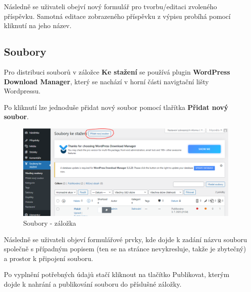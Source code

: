 \documentclass[12pt,a4paper]{article}
\begin{document}
	Následně se uživateli obejví nový formulář pro tvorbu/editaci zvoleného příspěvku. Samotná editace zobrazeného příspěvku z výpisu probíhá pomocí kliknutí na jeho název.
	
	\newpage
	\subsection{Soubory}
	Pro distribuci souborů v záložce \textbf{Ke stažení} se používá plugin \textbf{WordPress Download Manager}, který se nachází v horní části navigtační lišty Wordpressu.
	
	Po kliknutí lze jednoduše přidat nový soubor pomocí tlařítka \textbf{Přidat nový soubor}.
	
	\begin{figure}[htp]
		\centering
		\includegraphics[width=15cm]{WPupload0.png}
		\caption{Soubory - záložka}
		\label{fig:role}
	\end{figure}

	Následně se uživateli objeví formulářové prvky, kde dojde k zadání názvu souboru společně s případným popisem (ten se na stránce nevykresluje, takže je zbytečný) a prostor k připojení souboru.
	
	Po vyplnění potřebných údajů stačí kliknout na tlačítko Publikovat, kterým dojde k nahrání a publikování souboru do příslušné záložky.
	
\end{document}
